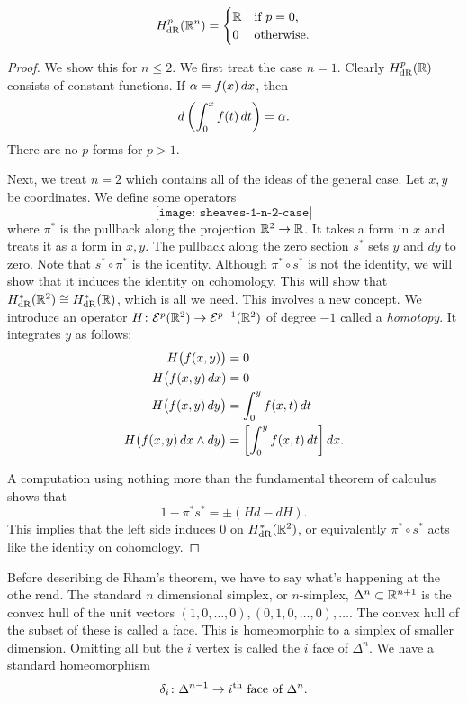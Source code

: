 \begin{theorem}
  \[
    H_{\mathrm{dR}}^p(\mathbb{R}^n)=
    \begin{cases}
      \mathbb{R}&\text{if \(p=0\),}\\
      0&\text{otherwise}.
    \end{cases}
  \]
\end{theorem}
\begin{proof}
  We show this for \(n\leq 2\). We first treat the case \(n=1\). Clearly
  \(H_{\mathrm{dR}}^p(\mathbb{R})\) consists of constant functions. If \(\alpha=f(x)\mathop{}\!d
  x\), then
  \[
    d\left(\int_0^x f(t)\mathop{}\!d t\right)=\alpha.
  \]
  There are no \(p\)-forms for \(p>1\).

  Next, we treat \(n=2\) which contains all of the ideas of the general
  case. Let \(x,y\) be coordinates. We define some operators
  \[
    \texttt{[image: sheaves-1-n-2-case]}
  \]
  where \(\pi^*\) is the pullback along the projection
  \(\mathbb{R}^2\to\mathbb{R}\). It takes a form in \(x\) and treats it as a form in
  \(x,y\). The pullback along the zero section \(s^*\) sets \(y\) and
  \(dy\) to zero. Note that \(s^*\circ\pi^*\) is the identity. Although
  \(\pi^*\circ s^*\) is not the identity, we will show that it induces the
  identity on cohomology. This will show that \(H_{\mathrm{dR}}^*(\mathbb{R}^2)\cong
  H_{\mathrm{dR}}^*(\mathbb{R})\), which is all we need. This involves a new concept. We
  introduce an operator \(H\colon\mathcal{E}^p(\mathbb{R}^2)\to\mathcal{E}^{p-1}(\mathbb{R}^2)\) of
  degree \(-1\) called a \emph{homotopy}. It integrates \(y\) as follows:
  \begin{align*}
    H\bigl(f(x,y)\bigr)&=0\\
    H\bigl(f(x,y)\mathop{}\!d x)&=0\\
    H\bigl(f(x,y)\mathop{}\!d y\bigr)
                       &=\int_0^y f(x,t)\mathop{}\!d t\\
    H\bigl(f(x,y)\mathop{}\!d x\wedge dy\bigr)
    &=\left[\int_0^y f(x,t)\mathop{}\!d t\right]dx.
  \end{align*}

  A computation using nothing more than the fundamental theorem of calculus
  shows that
  \[
    1-\pi^*s^*=\pm(Hd-dH).
  \]
  This implies that the left side induces \(0\) on \(H^*_{\mathrm{dR}}(\mathbb{R}^2)\),
  or equivalently \(\pi^*\circ s^*\) acts like the identity on
  cohomology.
\end{proof}

Before describing de Rham's theorem, we have to say what's happening at the
othe rend. The standard \(n\) dimensional simplex, or \(n\)-simplex,
\(\Delta^n\subset\mathbb{R}^{n+1}\) is the convex hull of the unit vectors
\((1,0,\dotsc,0),(0,1,0,\dotsc,0),\dotsc\). The convex hull of the subset of
these is called a face. This is homeomorphic to a simplex of smaller
dimension. Omitting all but the \(i\) vertex is called the
\(i\) face of \(\Delta^n\). We have a standard homeomorphism
\[
  \delta_i\colon\Delta^{n-1}\to\text{\(i\)\textsuperscript{th} face of \(\Delta^n\)}.
\]

